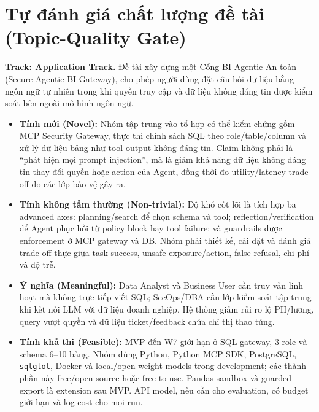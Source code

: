
\section{Tự đánh giá chất lượng đề tài (Topic-Quality Gate)}

\noindent\textbf{Track: Application Track.} Đề tài xây dựng một Cổng BI Agentic An toàn (Secure Agentic BI Gateway), cho phép người dùng đặt câu hỏi dữ liệu bằng ngôn ngữ tự nhiên trong khi quyền truy cập và dữ liệu không đáng tin được kiểm soát bên ngoài mô hình ngôn ngữ.

\begin{itemize}
    \item \textbf{Tính mới (Novel):} Nhóm tập trung vào tổ hợp có thể kiểm chứng gồm MCP Security Gateway, thực thi chính sách SQL theo role/table/column và xử lý dữ liệu bảng như tool output không đáng tin. Claim không phải là ``phát hiện mọi prompt injection'', mà là giảm khả năng dữ liệu không đáng tin thay đổi quyền hoặc action của Agent, đồng thời đo utility/latency trade-off do các lớp bảo vệ gây ra.
    \item \textbf{Tính không tầm thường (Non-trivial):} Độ khó cốt lõi là tích hợp ba advanced axes: planning/search để chọn schema và tool; reflection/verification để Agent phục hồi từ policy block hay tool failure; và guardrails được enforcement ở MCP gateway và DB. Nhóm phải thiết kế, cài đặt và đánh giá trade-off thực giữa task success, unsafe exposure/action, false refusal, chi phí và độ trễ.
    \item \textbf{Ý nghĩa (Meaningful):} Data Analyst và Business User cần truy vấn linh hoạt mà không trực tiếp viết SQL; SecOps/DBA cần lớp kiểm soát tập trung khi kết nối LLM với dữ liệu doanh nghiệp. Hệ thống giảm rủi ro lộ PII/lương, query vượt quyền và dữ liệu ticket/feedback chứa chỉ thị thao túng.
    \item \textbf{Tính khả thi (Feasible):} MVP đến W7 giới hạn ở SQL gateway, 3 role và schema 6--10 bảng. Nhóm dùng Python, Python MCP SDK, PostgreSQL, \texttt{sqlglot}, Docker và local/open-weight models trong development; các thành phần này free/open-source hoặc free-to-use. Pandas sandbox và guarded export là extension sau MVP. API model, nếu cần cho evaluation, có budget giới hạn và log cost cho mọi run.
\end{itemize}

